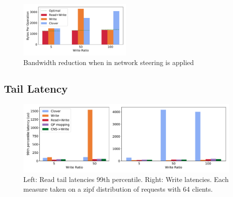 \begin{figure}
    \includegraphics[width=0.5\textwidth]{fig/bandwidth_reduction.pdf}
    \caption{{Bandwidth reduction when in network steering is applied}}
    \label{fig:bandwidth_reduction}
\end{figure}


\subsection{Tail Latency}

\begin{figure}
    \includegraphics[width=1.0\textwidth]{fig/99th_latency.pdf}
    \caption{Left: Read tail latencies 99th percentile. Right: Write latencies. Each measure taken on a zipf distribution of requests with 64 clients.}
    \label{fig:tail_latency}
\end{figure}
